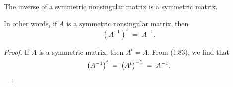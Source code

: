 \begin{lemma}
The inverse of a symmetric nonsingular matrix is a symmetric matrix.

In other words, if $A$ is a symmetric nonsingular matrix, then
\[
\left(A^{-1}\right)^{t} \;=\; A^{-1}.
\]
\end{lemma}

\begin{proof}
If $A$ is a symmetric matrix, then $A^{t}=A$. From (1.83), we find that
\[
\left(A^{-1}\right)^{t} \;=\; \left(A^{t}\right)^{-1} \;=\; A^{-1}. \qedhere
\]
\end{proof}
